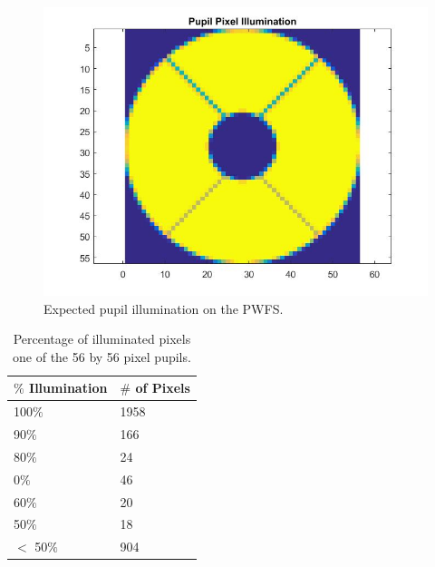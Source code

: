 	
\begin{figure}%
	\centering
	\includegraphics[width=.4\textwidth]{Chapter Materials/Chapter Three Materials/pupilpixels.jpg}
	\caption{Expected pupil illumination on the PWFS.}	
	\label{fig: pupilpixels}
\end{figure}
	
	
	
\begin{table}[h]
	\begin{center}       
		\begin{tabular}{|l|l|} %
				
				\hline%
				\rule[-1ex]{0pt}{3.5ex} $\%$ \textbf{Illumination} & \textbf{$\#$ of Pixels }  \\
				
				\hline%
				\rule[-1ex]{0pt}{3.5ex} 100$\%$ & 1958  \\
				\hline%
				\rule[-1ex]{0pt}{3.5ex} 90$\%$ & 166  \\
				\hline%
				\rule[-1ex]{0pt}{3.5ex} 80$\%$ & 24  \\
				\hline%
				\rule[-1ex]{0pt}{3.5ex} 0$\%$ & 46  \\
				\hline%
				\rule[-1ex]{0pt}{3.5ex} 60$\%$ & 20  \\
				\hline%
				\rule[-1ex]{0pt}{3.5ex} 50$\%$ & 18  \\
				\hline%
				\rule[-1ex]{0pt}{3.5ex} $<$ 50$\%$ & 904  \\
				\hline
		\end{tabular}
	\end{center}
	\caption{Percentage of illuminated pixels one of the 56 by 56 pixel pupils. }
	\label{tab:actuators}
\end{table}
	
